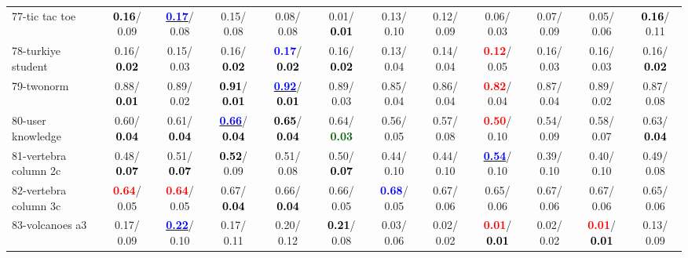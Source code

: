 \begin{table}[h]
\begin{center}
{\begin{tabular}{lc|c|c|c|c|c|c|c|c|c|c}
77-tic tac toe & \textcolor{black}{\textbf{  0.16}}/  0.09 & \underline{\textcolor{blue}{\textbf{  0.17}}}/  0.08 &   0.15/  0.08 &   0.08/  0.08 &   0.01/\textcolor{black}{\textbf{  0.01}} &   0.13/  0.10 &   0.12/  0.09 &   0.06/  0.03 &   0.07/  0.09 &   0.05/  0.06 & \textcolor{black}{\textbf{  0.16}}/  0.11 \\
78-turkiye student &   0.16/\textcolor{black}{\textbf{  0.02}} &   0.15/  0.03 &   0.16/\textcolor{black}{\textbf{  0.02}} & \textcolor{blue}{\textbf{  0.17}}/\textcolor{black}{\textbf{  0.02}} &   0.16/\textcolor{black}{\textbf{  0.02}} &   0.13/  0.04 &   0.14/  0.04 & \textcolor{red}{\textbf{  0.12}}/  0.05 &   0.16/  0.03 &   0.16/  0.03 &   0.16/\textcolor{black}{\textbf{  0.02}} \\ \hline
79-twonorm &   0.88/\textcolor{black}{\textbf{  0.01}} &   0.89/  0.02 & \textcolor{black}{\textbf{  0.91}}/\textcolor{black}{\textbf{  0.01}} & \underline{\textcolor{blue}{\textbf{  0.92}}}/\textcolor{black}{\textbf{  0.01}} &   0.89/  0.03 &   0.85/  0.04 &   0.86/  0.04 & \textcolor{red}{\textbf{  0.82}}/  0.04 &   0.87/  0.04 &   0.89/  0.02 &   0.87/  0.08 \\
80-user knowledge &   0.60/\textcolor{black}{\textbf{  0.04}} &   0.61/\textcolor{black}{\textbf{  0.04}} & \underline{\textcolor{blue}{\textbf{  0.66}}}/\textcolor{black}{\textbf{  0.04}} & \textcolor{black}{\textbf{  0.65}}/\textcolor{black}{\textbf{  0.04}} &   0.64/\textcolor{darkgreen}{\textbf{  0.03}} &   0.56/  0.05 &   0.57/  0.08 & \textcolor{red}{\textbf{  0.50}}/  0.10 &   0.54/  0.09 &   0.58/  0.07 &   0.63/\textcolor{black}{\textbf{  0.04}} \\
81-vertebra column 2c &   0.48/\textcolor{black}{\textbf{  0.07}} &   0.51/\textcolor{black}{\textbf{  0.07}} & \textcolor{black}{\textbf{  0.52}}/  0.09 &   0.51/  0.08 &   0.50/\textcolor{black}{\textbf{  0.07}} &   0.44/  0.10 &   0.44/  0.10 & \underline{\textcolor{blue}{\textbf{  0.54}}}/  0.10 &   0.39/  0.10 &   0.40/  0.10 &   0.49/  0.08 \\
82-vertebra column 3c & \textcolor{red}{\textbf{  0.64}}/  0.05 & \textcolor{red}{\textbf{  0.64}}/  0.05 &   0.67/\textcolor{black}{\textbf{  0.04}} &   0.66/\textcolor{black}{\textbf{  0.04}} &   0.66/  0.05 & \textcolor{blue}{\textbf{  0.68}}/  0.05 &   0.67/  0.06 &   0.65/  0.06 &   0.67/  0.06 &   0.67/  0.06 &   0.65/  0.06 \\
83-volcanoes a3 &   0.17/  0.09 & \underline{\textcolor{blue}{\textbf{  0.22}}}/  0.10 &   0.17/  0.11 &   0.20/  0.12 & \textcolor{black}{\textbf{  0.21}}/  0.08 &   0.03/  0.06 &   0.02/  0.02 & \textcolor{red}{\textbf{  0.01}}/\textcolor{black}{\textbf{  0.01}} &   0.02/  0.02 & \textcolor{red}{\textbf{  0.01}}/\textcolor{black}{\textbf{  0.01}} &   0.13/  0.09 \\

\end{tabular}}
\end{center}
\end{table}
